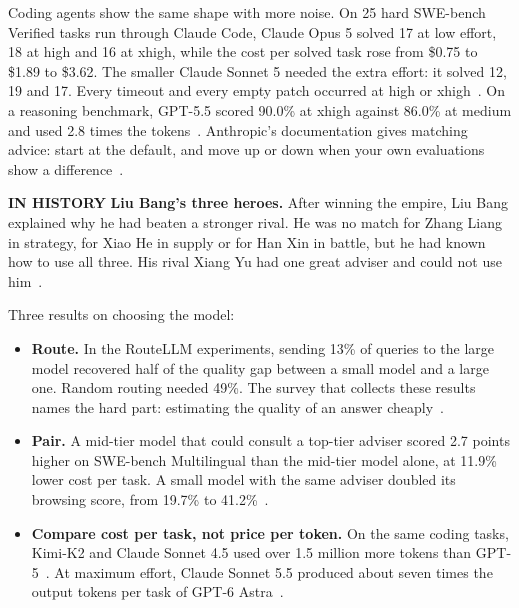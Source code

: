 \documentclass[11pt,letterpaper]{article}
\newcommand{\histlabel}[1]{{\sffamily\fontsize{7.6}{9.6}\selectfont\bfseries\color{muted}IN HISTORY}%
  \enspace\textbf{#1}\enspace}
\begin{document}
Coding agents show the same shape with more noise. On 25 hard SWE-bench Verified tasks run
through Claude Code, Claude Opus 5 solved 17 at low effort, 18 at high and 16 at xhigh, while
the cost per solved task rose from \$0.75 to \$1.89 to \$3.62. The smaller Claude Sonnet 5
needed the extra effort: it solved 12, 19 and 17. Every timeout and every empty patch occurred
at high or xhigh~\cite{waste}. On a reasoning benchmark, GPT-5.5 scored 90.0\% at xhigh
against 86.0\% at medium and used 2.8 times the tokens~\cite{ockbench}. Anthropic's
documentation gives matching advice: start at the default, and move up or down when your own
evaluations show a difference~\cite{effortdocs}.

\begin{history}
\histlabel{Liu Bang's three heroes.} After winning the empire, Liu Bang explained why he had
beaten a stronger rival. He was no match for Zhang Liang in strategy, for Xiao He in supply
or for Han Xin in battle, but he had known how to use all three. His rival Xiang Yu had one
great adviser and could not use him~\cite{shiji}.
\end{history}

Three results on choosing the model:

\begin{itemize}
  \item \textbf{Route.} In the RouteLLM experiments, sending 13\% of queries to the large
        model recovered half of the quality gap between a small model and a large one. Random
        routing needed 49\%. The survey that collects these results names the hard part:
        estimating the quality of an answer cheaply~\cite{routing}.
  \item \textbf{Pair.} A mid-tier model that could consult a top-tier adviser scored 2.7
        points higher on SWE-bench Multilingual than the mid-tier model alone, at 11.9\% lower
        cost per task. A small model with the same adviser doubled its browsing score, from
        19.7\% to 41.2\%~\cite{advisor}.
  \item \textbf{Compare cost per task, not price per token.} On the same coding tasks,
        Kimi-K2 and Claude Sonnet 4.5 used over 1.5 million more tokens than
        GPT-5~\cite{bai}. At maximum effort, Claude Sonnet 5.5 produced about seven times the
        output tokens per task of GPT-6 Astra~\cite{datanorth}.
\end{itemize}
\end{document}
